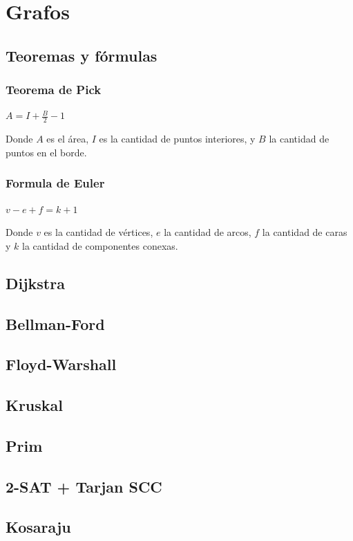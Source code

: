 \section{Grafos}%
\subsection{Teoremas y fórmulas}
{
\subsubsection{Teorema de Pick}
{
$A=I+\frac{B}{2}-1$

Donde \(A\) es el área, \(I\) es la cantidad de puntos interiores, y \(B\) la cantidad de puntos en el borde.
}

\subsubsection{Formula de Euler}
{
$v-e+f=k+1$

Donde \(v\) es la cantidad de vértices, \(e\) la cantidad de arcos, \(f\) la cantidad de caras y \(k\) la cantidad de componentes conexas.
}
}
\subsection{Dijkstra}
\subsection{Bellman-Ford}
\subsection{Floyd-Warshall}
\subsection{Kruskal}
\subsection{Prim}
\subsection{2-SAT + Tarjan SCC}
\subsection{Kosaraju}

